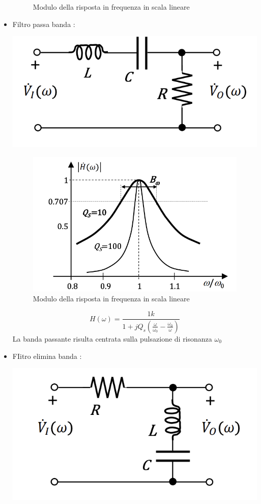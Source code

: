 \documentclass{article}
\theoremstyle{definition}
\begin{document}
\begin{itemize}
\begin{figure}[h]
	\caption{Modulo della risposta in frequenza in scala lineare}
\end{figure}
\item Filtro passa banda : 
\begin{center}
\includegraphics[scale=0.50]{immagini/passabRLC}
\end{center}
\begin{figure}[h]
	\centering 
	\includegraphics[scale=0.50]{immagini/passabg}
	\caption{Modulo della risposta in frequenza in scala lineare}
\end{figure}
$$H(\omega)=\frac{1                                                                                                                                                                                                  k}{1+jQ_s\left(\frac{\omega}{\omega_0}-\frac{\omega_0}{\omega}\right) }$$
La banda passante risulta centrata sulla pulsazione di risonanza $\omega_0$
\item FIitro elimina banda :
\begin{center}
\includegraphics[scale=0.40]{immagini/eliminabRLC}

\end{center}
\end{itemize}
\end{document}
